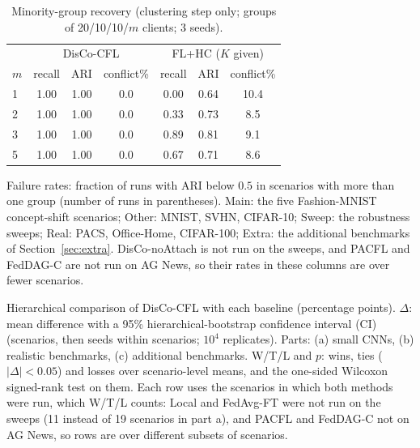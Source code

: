 \begin{table}[!htbp]
\centering
\caption{Minority-group recovery (clustering step only; groups of 20/10/10/$m$ clients; 3 seeds).}\label{tab:minority}
\small
\begin{tabular}{lcccccc}
\toprule
& \multicolumn{3}{c}{DisCo-CFL} & \multicolumn{3}{c}{FL+HC ($K$ given)} \\
\cmidrule(lr){2-4}\cmidrule(lr){5-7}
$m$ & recall & ARI & conflict\% & recall & ARI & conflict\% \\
\midrule
1 & 1.00 & 1.00 & 0.0 & 0.00 & 0.64 & 10.4\\
2 & 1.00 & 1.00 & 0.0 & 0.33 & 0.73 & 8.5\\
3 & 1.00 & 1.00 & 0.0 & 0.89 & 0.81 & 9.1\\
5 & 1.00 & 1.00 & 0.0 & 0.67 & 0.71 & 8.6\\
\bottomrule
\end{tabular}
\end{table}

\begin{tableorg}[!htbp]
\centering
\caption{Failure rates: fraction of runs with ARI below $0.5$ in scenarios with more than one group (number of runs in parentheses). Main: the five Fashion-MNIST concept-shift scenarios; Other: MNIST, SVHN, CIFAR-10; Sweep: the robustness sweeps; Real: PACS, Office-Home, CIFAR-100; Extra: the additional benchmarks of Section~\ref{sec:extra}. DisCo-noAttach is not run on the sweeps, and PACFL and FedDAG-C are not run on AG News, so their rates in these columns are over fewer scenarios.}\label{tab:failure}

\end{tableorg}

\begin{tableorg}[!htbp]
\centering
\caption{Hierarchical comparison of DisCo-CFL with each baseline (percentage points). $\Delta$: mean difference with a 95\% hierarchical-bootstrap confidence interval (CI) (scenarios, then seeds within scenarios; $10^4$ replicates). Parts: (a) small CNNs, (b) realistic benchmarks, (c) additional benchmarks. W/T/L and $p$: wins, ties ($|\Delta|<0.05$) and losses over scenario-level means, and the one-sided Wilcoxon signed-rank test on them. Each row uses the scenarios in which both methods were run, which W/T/L counts: Local and FedAvg-FT were not run on the sweeps (11 instead of 19 scenarios in part a), and PACFL and FedDAG-C not on AG News, so rows are over different subsets of scenarios.}\label{tab:hier}

\end{tableorg}

